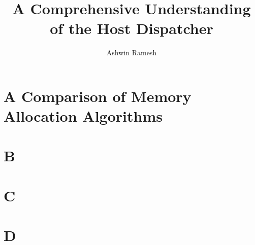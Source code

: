 \documentclass[12pt]{report}
\title{A Comprehensive Understanding of the Host Dispatcher}
\author{Ashwin Ramesh}
\begin{document}
\maketitle
\section[15pt]{A Comparison of Memory Allocation Algorithms}
\section{B}
\section{C}
\section{D}
\end{document}
